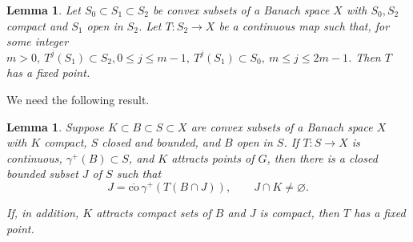 \documentclass{surv-l}
\theoremstyle{plain}
\newtheorem{lemma}[theorem]{Lemma}
\theoremstyle{definition}
\numberwithin{equation}{section}
\numberwithin{figure}{chapter}
\begin{document}
\begin{lemma}\label{lem2.6.4} Let $S_{0}\subset S_{1}\subset S_{2}$ be convex subsets of a Banach space $X$ with $S_{0}, S_{2}$ compact and $S_{1}$ open in $S_{2}$. Let $T\!:S_{2}\rightarrow X$ be a continuous map such that, for some integer $m>0,\ T^{j}(S_{1})\subset S_{2},0\leq j\leq m-1,\ T^{j}(S_{1})\subset S_{0},\ m\leq j\leq 2m-1$. Then $T$ has a fixed point.
\end{lemma}

We need the following result.

\begin{lemma}\label{lem2.6.5} Suppose $K\subset B\subset S\subset X$ are convex subsets of a Banach space $X$ with $K$ compact, $S$ closed and bounded, and $B$ open in $S$. If $T\!:S\rightarrow X$ is continuous, $\gamma^{+}(B)\subset S$, and $K$ attracts points of $G$, then there is a closed bounded subset $J$ of $S$ such that
\setcounter{equation}{0}
\begin{equation}\label{eq6.1}
J=\overline{\mathrm{co}}\, \gamma^{+}(T(B\cap J)),\qquad J\cap K\neq\varnothing.
\end{equation}

If, in addition, $K$ attracts compact sets of $B$ and $J$ is compact, then $T$ has a fixed point.
\end{lemma}
\end{document}
